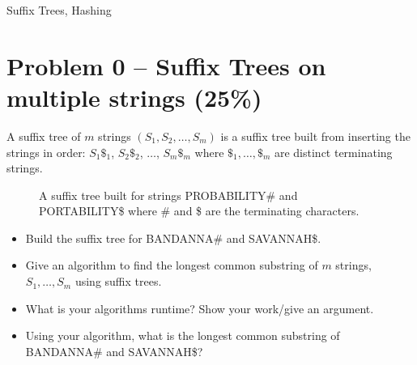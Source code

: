 \documentclass[12pt,letterpaper]{article}
\begin{document}
\begin{center}
    \LARGE Suffix Trees, Hashing
\end{center}


\section*{Problem 0 -- Suffix Trees on multiple strings (25\%)}
A suffix tree of $m$ strings $(S_1,S_2,\dots,S_m)$ is a suffix tree built from inserting the strings in order: $S_1\$_1$, $S_2\$_2$, $\dots$, $S_m\$_m$ where $\$_1,\dots,\$_m$ are distinct terminating strings.

\begin{figure}[h!]
    \centering
    \caption{A suffix tree built for strings PROBABILITY\# and PORTABILITY\$ where \# and \$ are the terminating characters.}
    \label{st}
\end{figure}

\begin{itemize}
    \item Build the suffix tree for BANDANNA\# and SAVANNAH\$.
    \item Give an algorithm to find the longest common substring of $m$ strings, $S_1,\dots,S_m$ using suffix trees. 
    \item What is your algorithms runtime? Show your work/give an argument.
    \item Using your algorithm, what is the longest common substring of BANDANNA\# and SAVANNAH\$?
\end{itemize}    
\end{document}
